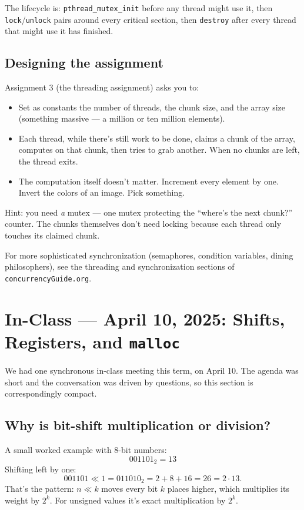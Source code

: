 \documentclass[11pt]{article}
\begin{document}
The lifecycle is: \texttt{pthread\_mutex\_init} before any thread
might use it, then \texttt{lock}/\texttt{unlock} pairs around every
critical section, then \texttt{destroy} after every thread that
might use it has finished.

\subsection*{Designing the assignment}

Assignment 3 (the threading assignment) asks you to:

\begin{itemize}
  \item Set as constants the number of threads, the chunk size, and
    the array size (something massive --- a million or ten million
    elements).
  \item Each thread, while there's still work to be done, claims a
    chunk of the array, computes on that chunk, then tries to grab
    another. When no chunks are left, the thread exits.
  \item The computation itself doesn't matter. Increment every
    element by one. Invert the colors of an image. Pick something.
\end{itemize}

Hint: you need \emph{a} mutex --- one mutex protecting the
``where's the next chunk?'' counter. The chunks themselves don't
need locking because each thread only touches its claimed chunk.

For more sophisticated synchronization (semaphores, condition
variables, dining philosophers), see the threading and synchronization
sections of \texttt{concurrencyGuide.org}.

\section{In-Class --- April 10, 2025: Shifts, Registers, and \texttt{malloc}}

We had one synchronous in-class meeting this term, on April 10. The
agenda was short and the conversation was driven by questions, so
this section is correspondingly compact.

\subsection*{Why is bit-shift multiplication or division?}

A small worked example with 8-bit numbers:
\[
  001101_2 = 13
\]
Shifting left by one:
\[
  001101 \ll 1 = 011010_2 = 2 + 8 + 16 = 26 = 2 \cdot 13.
\]
That's the pattern: $n \ll k$ moves every bit $k$ places higher,
which multiplies its weight by $2^k$. For unsigned values it's exact
multiplication by $2^k$.
\end{document}
